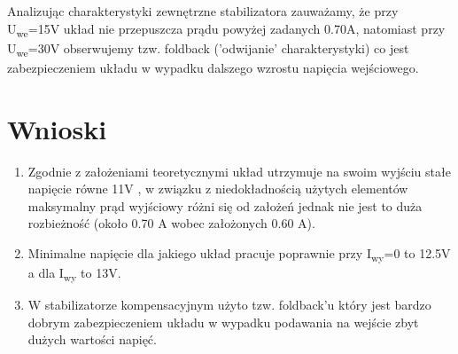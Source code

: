\documentclass[a4paper,12pt]{article}
\begin{document}
Analizując charakterystyki zewnętrzne stabilizatora zauważamy, że przy U\textsubscript{we}=15V układ nie przepuszcza prądu powyżej zadanych 0.70A,
natomiast przy U\textsubscript{we}=30V obserwujemy tzw. foldback ('odwijanie' charakterystyki) co jest zabezpieczeniem układu w wypadku dalszego
wzrostu napięcia wejściowego.

\section {Wnioski}

\begin{enumerate}  
\item Zgodnie z założeniami teoretycznymi układ utrzymuje na swoim wyjściu stałe napięcie równe 11V , w związku z niedokładnością użytych
  elementów maksymalny prąd wyjściowy różni się od założeń jednak nie jest to duża rozbieżność (około 0.70 A wobec założonych 0.60 A).
\item Minimalne napięcie dla jakiego układ pracuje poprawnie przy I\textsubscript{wy}=0 to 12.5V a dla I\textsubscript{wy} to 13V.
\item W stabilizatorze kompensacyjnym użyto tzw. foldback'u który jest bardzo dobrym zabezpieczeniem układu w wypadku podawania na wejście zbyt
  dużych wartości napięć.
\end{enumerate}
\end{document}
